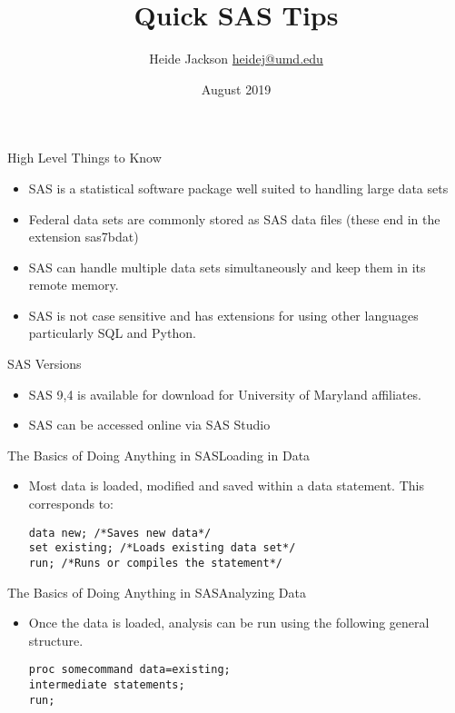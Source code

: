 \documentclass{beamer}
\title{Quick SAS Tips}
\author{\texorpdfstring{Heide Jackson \newline\url{heidej@umd.edu}}{Author}}
\institute{University of Maryland Population Research Center}
\date{August 2019}
\begin{document}
\maketitle
\begin{frame}{High Level Things to Know}
\begin{itemize}
\item SAS is a statistical software package well suited to handling large data sets
\item Federal data sets are commonly stored as SAS data files (these end in the extension sas7bdat)
\item SAS can handle multiple data sets simultaneously and keep them in its remote memory.
\item SAS is not case sensitive and has extensions for using other languages particularly SQL and Python.
\end{itemize}
\end{frame}


\begin{frame}{SAS Versions}
\begin{itemize}
\item SAS 9,4 is available for download for University of Maryland affiliates.
\item SAS can be accessed online via SAS Studio
\end{itemize}
\end{frame}

\begin{frame}[fragile]{The Basics of Doing Anything in SAS}{Loading in Data}
\begin{itemize}
\item Most data is loaded, modified and saved within a data statement.  This corresponds to: 
\begin{verbatim}
data new; /*Saves new data*/
set existing; /*Loads existing data set*/
run; /*Runs or compiles the statement*/
\end{verbatim}
\end{itemize}
\end{frame}


\begin{frame}[fragile]{The Basics of Doing Anything in SAS}{Analyzing Data}
\begin{itemize}
\item Once the data is loaded, analysis can be run using the following general structure.
\begin{verbatim}
proc somecommand data=existing;
intermediate statements;
run;
\end{verbatim}
\end{itemize}
\end{frame}
\end{document}
